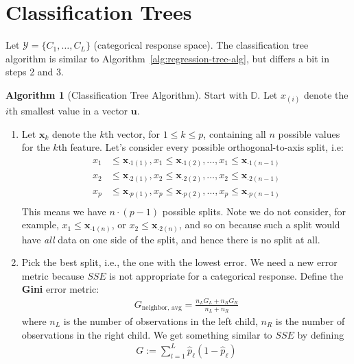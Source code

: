 \documentclass[12pt, a4paper]{article}
\theoremstyle{definition}
\newtheorem{algorithm}{Algorithm}
\begin{document}
	\section*{Classification Trees}
	Let $\mathcal{Y} = \{C_1, \ldots, C_L\}$ (categorical response space).
	The classification tree algorithm is similar to Algorithm~\ref{alg:regression-tree-alg},
	but differs a bit in steps 2 and 3.
	
	\begin{tcolorbox}[breakable]
		\begin{algorithm}[Classification Tree Algorithm]\label{alg:classification-tree-alg}
			Start with $\mathbb{D}$. Let $x_{(i)}$ denote the $i$th smallest
			value in a vector $\bm{u}$.
			\begin{enumerate}[label=(\arabic*)]
				\item Let $\bm{x}_k$ denote the $k$th vector, for $1\leq k\leq p$,
				containing all $n$ possible values for the $k$th feature.
				Let's consider every possible orthogonal-to-axis split, i.e:
				\begin{align*}
					x_1&\leq \bm{x}_{\cdot 1(1)}, x_1 \leq \bm{x}_{\cdot 1(2)}, \ldots, x_1 \leq \bm{x}_{\cdot 1(n-1)}\\
					x_2&\leq \bm{x}_{\cdot 2(1)}, x_2 \leq \bm{x}_{\cdot 2(2)}, \ldots, x_2 \leq \bm{x}_{\cdot 2(n-1)}\\
					x_p&\leq \bm{x}_{\cdot p(1)}, x_p \leq \bm{x}_{\cdot p(2)}, \ldots, x_p \leq \bm{x}_{\cdot p(n-1)}\\
				\end{align*}
				This means we have $n\cdot (p-1)$ possible splits. Note we do not
				consider, for example, $x_1\leq \bm{x}_{\cdot 1(n)}$,
				or $x_2\leq \bm{x}_{\cdot 2(n)}$, and so on because such a split
				would have \textit{all} data on one side of the split, and hence
				there is no split at all.
				\item Pick the best split, i.e., the one with the lowest error.
				We need a new error metric because $SSE$ is not appropriate for
				a categorical response. Define the \textbf{Gini} error metric:
				\begin{align*}
					G_{\text{neighbor, avg}} = \frac{n_L G_L + n_R G_R}{n_L + n_R}
				\end{align*}
				where $n_L$ is the number of observations in the left child,
				$n_R$ is the number of observations in the right child.
				We get something similar to $SSE$ by defining
				\begin{align*}
					G := \sum_{l=1}^{L}\hat{p}_\ell(1 - \hat{p}_\ell)

\end{align*}
\end{enumerate}
\end{algorithm}
\end{tcolorbox}
\end{document}
